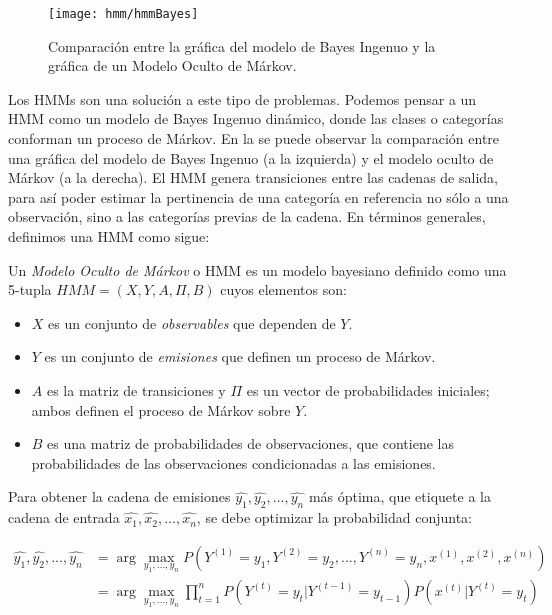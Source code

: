 \begin{figure}
 \centering
 \texttt{[image: hmm/hmmBayes]}
 \caption{Comparación entre la gráfica del modelo de Bayes Ingenuo y la gráfica de un Modelo Oculto de Márkov.}\label{Fig:BayesMárkov}
\end{figure}

Los HMMs son una solución a este tipo de problemas. Podemos pensar a un HMM como un modelo de Bayes Ingenuo dinámico, donde las clases o categorías conforman un proceso de Márkov. En la  se puede observar la comparación entre una gráfica del modelo de Bayes Ingenuo (a la izquierda) y el modelo oculto de Márkov (a la derecha). El HMM genera transiciones entre las cadenas de salida, para así poder estimar la pertinencia de una categoría en referencia no sólo a una observación, sino a las categorías previas de la cadena. En términos generales, definimos una HMM como sigue:


\begin{definition}
  Un \emph{Modelo Oculto de Márkov} o HMM es un modelo bayesiano definido como una 5-tupla $HMM = (X, Y, A, \Pi, B)$ cuyos elementos son:

\begin{itemize}
    \item $X$ es un conjunto de \emph{observables} que dependen de $Y$.
    \item  $Y$ es un conjunto de \emph{emisiones} que definen un proceso de Márkov.
    \item $A$ es la matriz de transiciones y $\Pi$ es un vector de probabilidades iniciales; ambos definen el proceso de Márkov sobre $Y$.
    \item $B$ es una matriz de probabilidades de observaciones, que contiene las probabilidades de las observaciones condicionadas a las emisiones.
  \end{itemize}
\end{definition}

Para obtener la cadena de emisiones $\hat{y_1}, \hat{y_2}, ... , \hat{y_n}$ más óptima, que etiquete a la cadena de entrada $\hat{x_1}, \hat{x_2}, ... , \hat{x_n}$, se debe optimizar la probabilidad conjunta:

\begin{align}
    \hat{y_1}, \hat{y_2}, ... , \hat{y_n} &= \arg\max_{y_1,...,y_n} P(Y^{(1)}=y_1, Y^{(2)}=y_2,...,Y^{(n)}=y_n, x^{(1)}, x^{(2)}, x^{(n)}) \nonumber \\
    &= \arg\max_{y_1,...,y_n} \prod_{t=1}^n P(Y^{(t)}=y_t | Y^{(t-1)}=y_{t-1}) P(x^{(t)}|Y^{(t)}=y_t) \label{eq:HMM}
\end{align}

